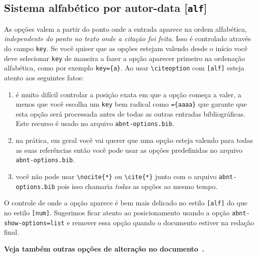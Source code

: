 \documentclass[espacosimples]{abnt}
\begin{document}
\subsection{Sistema alfabético por autor-data [{\tt alf}]}
As opções valem a partir do ponto onde a entrada aparece na ordem alfabética,
\emph{independente do ponto no texto onde a citação foi feita}.
Isso é controlado através do campo {\tt key}. Se você quiser que
as opções estejam valendo desde o início você deve selecionar {\tt key}
de maneira a fazer a opção aparecer primeiro na ordenação alfabética,
como por exemplo {\tt key=\{a\}}.
Ao usar \verb+\citeoption+ com {\tt [alf]} esteja atento aos
seguintes fatos:
\begin{enumerate}
\item é muito difícil controlar a posição exata em que a opção
      começa a valer, a menos que você escolha um {\tt key} bem
      radical como {\tt=\{aaaa\}} que garante que esta opção será
      processada antes de todas as outras entradas bibliográficas.
      Este recurso é usado no arquivo {\tt abnt-options.bib}.
\item na prática, em geral você vai querer que uma opção esteja
      valendo para todas as suas referências então você pode usar
      as opções predefinidas no arquivo {\tt abnt-options.bib}.
\item você não pode usar \verb+\nocite{*}+ ou \verb+\cite{*}+
      junto com o arquivo
      {\tt abnt-options.bib} pois isso chamaria \emph{todas} as
      opções ao mesmo tempo.
\end{enumerate}


O controle de onde a opção aparece é bem mais delicado no estilo {\tt [alf]}
do que no estilo {\tt [num]}. Sugerimos ficar atento ao posicionamento
usando a opção {\tt abnt-show-options=list} e remover essa opção quando o
documento estiver na redação final.

{\bf Veja também outras opções de alteração no documento~.}
\end{document}
